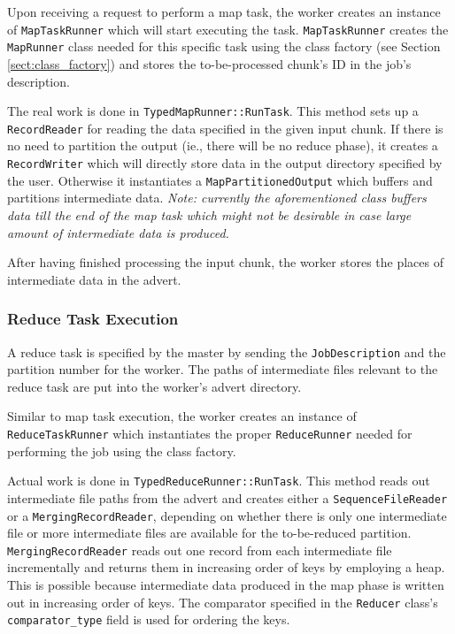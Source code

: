 \documentclass{article}
\begin{document}
Upon receiving a request to perform a map task, the worker creates an instance of \texttt{MapTaskRunner} which will start executing the task. \texttt{MapTaskRunner} creates the \texttt{MapRunner} class needed for this specific task using the class factory (see Section \ref{sect:class_factory}) and stores the to-be-processed chunk's ID in the job's description.

The real work is done in \texttt{TypedMapRunner::RunTask}. This method sets up a \texttt{RecordReader} for reading the data specified in the given input chunk. If there is no need to partition the output (ie., there will be no reduce phase), it creates a \texttt{RecordWriter} which will directly store data in the output directory specified by the user. Otherwise it instantiates a \texttt{MapPartitionedOutput} which buffers and partitions intermediate data. \emph{Note: currently the aforementioned class buffers data till the end of the map task which might not be desirable in case large amount of intermediate data is produced.}

After having finished processing the input chunk, the worker stores the places of intermediate data in the advert.

\subsubsection{Reduce Task Execution}

A reduce task is specified by the master by sending the \texttt{JobDescription} and the partition number for the worker. The paths of intermediate files relevant to the reduce task are put into the worker's advert directory.

Similar to map task execution, the worker creates an instance of \texttt{ReduceTaskRunner} which instantiates the proper \texttt{ReduceRunner} needed for performing the job using the class factory.

Actual work is done in \texttt{TypedReduceRunner::RunTask}. This method reads out intermediate file paths from the advert and creates either a \texttt{SequenceFileReader} or a \texttt{MergingRecordReader}, depending on whether there is only one intermediate file or more intermediate files are available for the to-be-reduced partition. \texttt{MergingRecordReader} reads out one record from each intermediate file incrementally and returns them in increasing order of keys by employing a heap. This is possible because intermediate data produced in the map phase is written out in increasing order of keys. The comparator specified in the \texttt{Reducer} class's \texttt{comparator\_type} field is used for ordering the keys.
\end{document}
